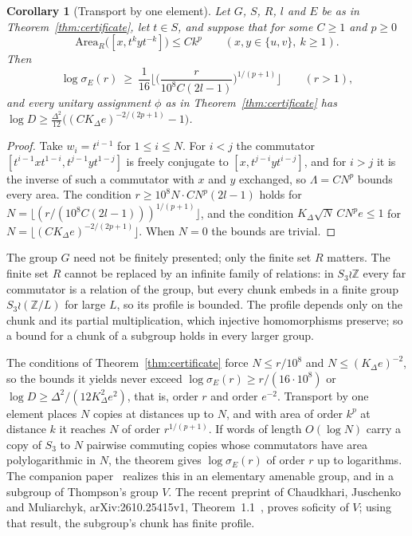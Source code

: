 \documentclass[11pt,a4paper]{article}
\theoremstyle{plain}
\newtheorem{corollary}[theorem]{Corollary}
\theoremstyle{definition}
\theoremstyle{remark}
\begin{document}
\begin{corollary}[Transport by one element]\label{cor:cyclic}
Let $G$, $S$, $R$, $l$ and $E$ be as in Theorem~\ref{thm:certificate}, let $t\in S$, and suppose that for some $C\ge1$ and $p\ge0$
\[
\mathrm{Area}_R\bigl([x,t^kyt^{-k}]\bigr)\le Ck^p\qquad(x,y\in\{u,v\},\ k\ge1).
\]
Then
\[
\log\sigma_E(r)\ \ge\ \frac1{16}\Big\lfloor\Big(\frac r{10^8C(2l-1)}\Big)^{1/(p+1)}\Big\rfloor\qquad(r>1),
\]
and every unitary assignment $\phi$ as in Theorem~\ref{thm:certificate} has $\log D\ge\frac{\Delta^2}{12}\bigl((CK_\Delta e)^{-2/(2p+1)}-1\bigr)$.
\end{corollary}

\begin{proof}
Take $w_i=t^{i-1}$ for $1\le i\le N$. For $i<j$ the commutator $[t^{i-1}xt^{1-i},t^{j-1}yt^{1-j}]$ is freely conjugate to
$[x,t^{j-i}yt^{i-j}]$, and for $i>j$ it is the inverse of such a commutator with $x$ and $y$ exchanged, so $\Lambda=CN^p$ bounds every area. The
condition $r\ge10^8N\cdot CN^p(2l-1)$ holds for $N=\lfloor(r/(10^8C(2l-1)))^{1/(p+1)}\rfloor$, and the condition $K_\Delta\sqrt N\,CN^pe\le1$
for $N=\lfloor(CK_\Delta e)^{-2/(2p+1)}\rfloor$. When $N=0$ the bounds are trivial.
\end{proof}

The group $G$ need not be finitely presented; only the finite set $R$ matters. The finite set $R$ cannot be replaced by an infinite family of relations: in
$S_3\wr\mathbb Z$ every far commutator is a relation of the group, but every chunk embeds in a finite group $S_3\wr(\mathbb Z/L)$ for large
$L$, so its profile is bounded. The profile depends only on the chunk and its partial multiplication, which injective homomorphisms preserve;
so a bound for a chunk of a subgroup holds in every larger group.

The conditions of Theorem~\ref{thm:certificate} force $N\le r/10^8$ and $N\le(K_\Delta e)^{-2}$, so the bounds it yields never
exceed $\log\sigma_E(r)\ge r/(16\cdot10^8)$ or $\log D\ge\Delta^2/(12K_\Delta^2e^2)$, that is, order $r$ and order $e^{-2}$. Transport by one element places $N$ copies at distances up to $N$, and with area
of order $k^p$ at distance $k$ it reaches $N$ of order $r^{1/(p+1)}$. If words of length $O(\log N)$ carry a copy of $S_3$ to
$N$ pairwise commuting copies whose commutators have area polylogarithmic in $N$, the theorem gives $\log\sigma_E(r)$ of order $r$ up to
logarithms. The companion paper~\cite{DouglasMghirbiC} realizes this in an elementary amenable group, and in a subgroup of Thompson's group $V$.
The recent preprint of Chaudkhari, Juschenko and Muliarchyk,
arXiv:2610.25415v1, Theorem~1.1~\cite{CJM2026}, proves soficity of $V$;
using that result, the subgroup's chunk has finite profile.
\end{document}
